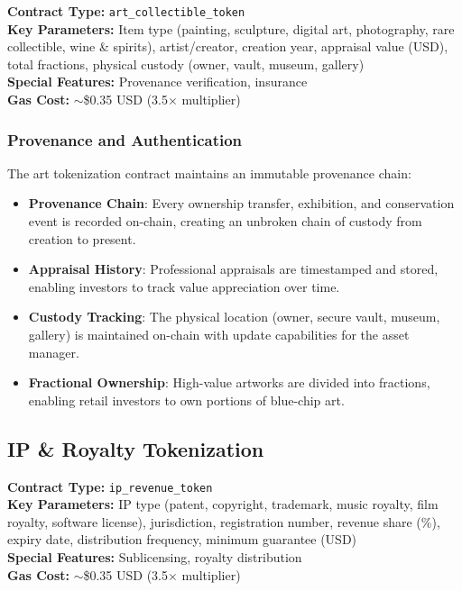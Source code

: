 \documentclass[11pt,a4paper,twoside]{article}
\begin{document}
\begin{keyinsight}
\textbf{Contract Type:} \texttt{art\_collectible\_token}\\
\textbf{Key Parameters:} Item type (painting, sculpture, digital art, photography, rare collectible, wine \& spirits), artist/creator, creation year, appraisal value (USD), total fractions, physical custody (owner, vault, museum, gallery)\\
\textbf{Special Features:} Provenance verification, insurance\\
\textbf{Gas Cost:} $\sim$\$0.35 USD (3.5$\times$ multiplier)
\end{keyinsight}

\subsubsection{Provenance and Authentication}

The art tokenization contract maintains an immutable provenance chain:

\begin{itemize}
  \item \textbf{Provenance Chain}: Every ownership transfer, exhibition, and conservation event is recorded on-chain, creating an unbroken chain of custody from creation to present.
  \item \textbf{Appraisal History}: Professional appraisals are timestamped and stored, enabling investors to track value appreciation over time.
  \item \textbf{Custody Tracking}: The physical location (owner, secure vault, museum, gallery) is maintained on-chain with update capabilities for the asset manager.
  \item \textbf{Fractional Ownership}: High-value artworks are divided into fractions, enabling retail investors to own portions of blue-chip art.
\end{itemize}

\subsection{IP \& Royalty Tokenization}
\label{subsec:ip}

\begin{keyinsight}
\textbf{Contract Type:} \texttt{ip\_revenue\_token}\\
\textbf{Key Parameters:} IP type (patent, copyright, trademark, music royalty, film royalty, software license), jurisdiction, registration number, revenue share (\%), expiry date, distribution frequency, minimum guarantee (USD)\\
\textbf{Special Features:} Sublicensing, royalty distribution\\
\textbf{Gas Cost:} $\sim$\$0.35 USD (3.5$\times$ multiplier)
\end{keyinsight}
\end{document}
